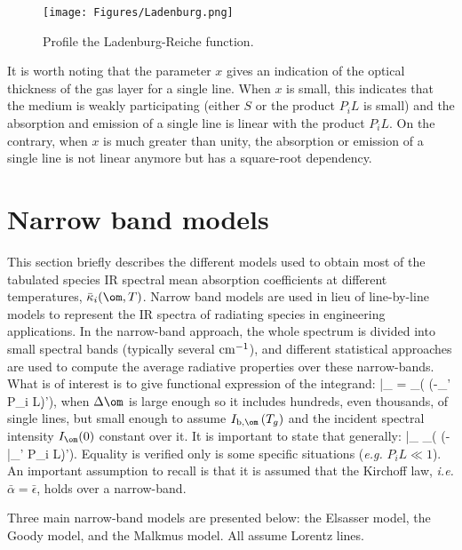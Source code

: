 \begin{figure}
\begin{center}
 \texttt{[image: Figures/Ladenburg.png]}
\end{center}
 \caption{Profile the Ladenburg-Reiche function. \label{fig:Ladenburg}}
\end{figure}

It is worth noting that the parameter $x$ gives an indication of the optical thickness of the gas layer for a single line. When $x$ is small, this indicates that the medium is weakly participating (either $S$ or the product $P_iL$ is small) and the absorption and emission of a single line is linear with the product $P_iL$. On the contrary, when $x$ is much greater than unity, the absorption or emission of a single line is not linear anymore but has a square-root dependency.

\section{Narrow band models}\label{Sec::SNBM}
This section briefly describes the different models used to obtain most of the tabulated species IR spectral mean absorption coefficients at different temperatures, $\bar{\kappa}_i(\om,T)$. Narrow band models are used in lieu of line-by-line models to represent the IR spectra of radiating species in engineering applications. In the narrow-band approach, the whole spectrum is divided into small spectral bands (typically several $\rm cm^{-1}$), and different statistical approaches are used to compute the average radiative properties over these narrow-bands. What is of interest is to give functional expression of the integrand:
\be
\bar{\tau}_{\om} = \displaystyle\int_{\Delta \om}\left( \exp\left(-\kappa_{\om'} P_i L\right)\d \om'\right),
\ee
when $\Delta \om$ is large enough so it includes hundreds, even thousands, of single lines, but small enough to assume $I_{\rm b,\om}\left(T_g\right)$ and the incident spectral intensity $I_{\om}(0)$ constant over it. It is important to state that generally:
\be
\bar{\tau}_{\om} \neq \displaystyle\int_{\Delta \om}\left( \exp\left(-\bar{\kappa}_{\om'} P_i L\right)\d \om'\right).
\ee
Equality is verified only is some specific situations (\textit{e.g.} $P_iL \ll 1$). An important assumption to recall is that it is assumed that the Kirchoff law, \textit{i.e.} $\bar{\alpha} = \bar{\epsilon}$, holds over a narrow-band.

Three main narrow-band models are presented below: the Elsasser model, the Goody model, and the Malkmus model. All assume Lorentz lines.


